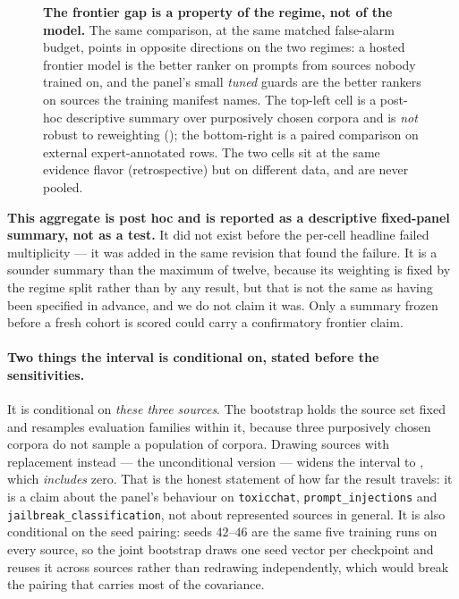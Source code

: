 \documentclass[11pt]{article}
\newcommand{\code}[1]{\texttt{\small #1}}
\begin{document}
\begin{figure}[htbp]
\begin{tikzpicture}
\end{tikzpicture}
\caption{\textbf{The frontier gap is a property of the regime, not of the model.} The same
comparison, at the same matched \HtwoBudget{} false-alarm budget, points in opposite directions on
the two regimes: a hosted frontier model is the better ranker on prompts from sources nobody trained
on, and the panel's small \emph{tuned} guards are the better rankers on sources the training manifest
names. The top-left cell is a post-hoc descriptive summary over \HtwoNRepSources{} purposively chosen
corpora and is \emph{not} robust to reweighting (); the bottom-right is a
paired comparison on external expert-annotated rows. The two cells sit at the same evidence flavor
(retrospective) but on different data, and are never pooled.}
\label{fig:regime-map}
\end{figure}

\textbf{This aggregate is post hoc and is reported as a descriptive fixed-panel summary, not as a
test.} It did not exist before the per-cell headline failed multiplicity --- it was added in the
same revision that found the failure. It is a sounder summary than the maximum of twelve, because
its weighting is fixed by the regime split rather than by any result, but that is not the same as
having been specified in advance, and we do not claim it was. Only a summary frozen before a fresh
cohort is scored could carry a confirmatory frontier claim.

\paragraph{Two things the interval is conditional on, stated before the sensitivities.} It is
conditional on \emph{these three sources}. The bootstrap holds the source set fixed and resamples
evaluation families within it, because three purposively chosen corpora do not sample a population
of corpora. Drawing sources with replacement instead --- the unconditional version --- widens the
interval to \HtwoAggSrcResampledCI, which \emph{includes} zero. That is the honest statement of how
far the result travels: it is a claim about the panel's behaviour on \code{toxicchat},
\code{prompt\_injections} and \code{jailbreak\_classification}, not about represented sources in
general. It is also conditional on the seed pairing: seeds $42$--$46$ are the same five training
runs on every source, so the joint bootstrap draws one seed vector per checkpoint and reuses it
across sources rather than redrawing independently, which would break the pairing that carries
most of the covariance.
\end{document}
